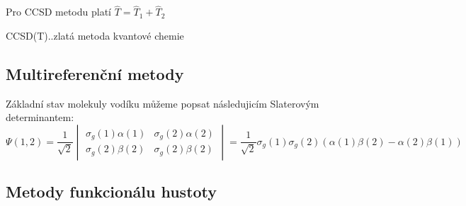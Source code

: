Pro CCSD metodu platí $\hat{T}=\hat{T}_1+\hat{T}_2$

CCSD(T)..zlatá metoda kvantové chemie

\subsection{Multireferenční metody}

Základní stav molekuly vodíku můžeme popsat následujicím Slaterovým determinantem:
\begin{equation}
\Psi (1,2)=\frac{1}{\sqrt{2}}
\begin{vmatrix}
\sigma_g(1)\alpha (1) & \sigma_g(2)\alpha (2) \\
\sigma_g(2)\beta (2) & \sigma_g(2)\beta (2)
\end{vmatrix}
=\frac{1}{\sqrt{2}}\sigma_g(1)\sigma_g(2)(\alpha (1)\beta (2)-\alpha (2)\beta (1))
\end{equation}

\subsection{Metody funkcionálu hustoty}


